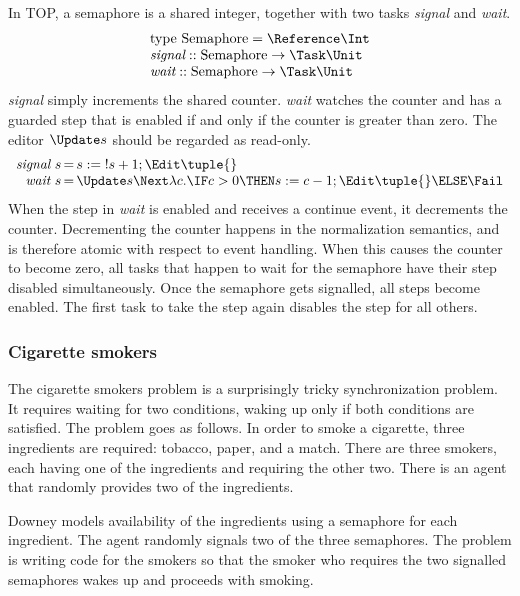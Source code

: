 In TOP, a semaphore is a shared integer, together with two tasks \emph{signal} and \emph{wait}.
\begin{equation*}
  \begin{array}{l}
  \text{type}\ \text{Semaphore} = \Reference \Int \\
  \textit{signal} :: \text{Semaphore} \to \Task \Unit \\
  \textit{wait}   :: \text{Semaphore} \to \Task \Unit
  \end{array}
\end{equation*}
\emph{signal} simply increments the shared counter.
\emph{wait} watches the counter and has a guarded step that is enabled if and only if the counter is greater than zero.
The editor $\Update s$ should be regarded as read-only.
\begin{equation*}
  \begin{array}{r @{\,} c @{\,} l}
    \textit{signal}\ s & = & s := {!s} + 1; \Edit \tuple{} \\
    \textit{wait}\ s   & = & \Update s \Next \lambda c. \IF c > 0 \THEN s := c - 1; \Edit \tuple{} \ELSE \Fail
  \end{array}
\end{equation*}
When the step in \emph{wait} is enabled and receives a continue event, it decrements the counter.
Decrementing the counter happens in the normalization semantics, and is therefore atomic with respect to event handling.
When this causes the counter to become zero, all tasks that happen to wait for the semaphore have their step disabled simultaneously.
Once the semaphore gets signalled, all steps become enabled.
The first task to take the step again disables the step for all others.


\subsubsection{Cigarette smokers}

The cigarette smokers problem \cite{books/Downey08LBOS} is a surprisingly tricky synchronization problem.
It requires waiting for two conditions, waking up only if both conditions are satisfied.
The problem goes as follows.
In order to smoke a cigarette, three ingredients are required: tobacco, paper, and a match.
There are three smokers, each having one of the ingredients and requiring the other two.
There is an agent that randomly provides two of the ingredients.

Downey models availability of the ingredients using a semaphore for each ingredient.
The agent randomly signals two of the three semaphores.
The problem is writing code for the smokers so that the smoker who requires the two signalled semaphores wakes up and proceeds with smoking.

